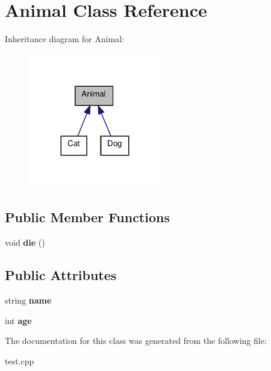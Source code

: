 \hypertarget{classAnimal}{\section{Animal Class Reference}
\label{classAnimal}
}


Inheritance diagram for Animal\+:\nopagebreak
\begin{figure}[H]
\begin{center}
\leavevmode
\includegraphics[width=164pt]{classAnimal__inherit__graph}
\end{center}
\end{figure}
\subsection*{Public Member Functions}
\begin{DoxyCompactItemize}
\item 
\hypertarget{classAnimal_a557fe0d71dda75be2f8459ce0d7c2275}{void {\bfseries die} ()}\label{classAnimal_a557fe0d71dda75be2f8459ce0d7c2275}

\end{DoxyCompactItemize}
\subsection*{Public Attributes}
\begin{DoxyCompactItemize}
\item 
\hypertarget{classAnimal_a9cf3bfd9070daec7b3bbc87cbd958f35}{string {\bfseries name}}\label{classAnimal_a9cf3bfd9070daec7b3bbc87cbd958f35}

\item 
\hypertarget{classAnimal_a31e4a23bef9596927496de4eb6b9c721}{int {\bfseries age}}\label{classAnimal_a31e4a23bef9596927496de4eb6b9c721}

\end{DoxyCompactItemize}


The documentation for this class was generated from the following file\+:\begin{DoxyCompactItemize}
\item 
test.\+cpp\end{DoxyCompactItemize}
